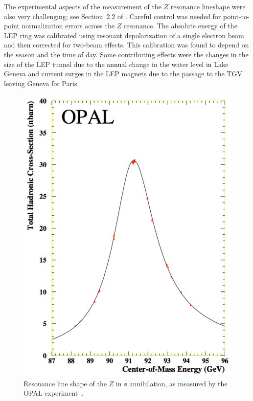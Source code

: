 \documentclass[12pt]{article}
\begin{document}
The experimental aspects of the measurement of the $Z$ resonance
lineshape were also very challenging; see Section~2.2 of \cite{LEPEWWG}.  Careful control was needed for
point-to-point normalization errors across the $Z$ resonance.  The
absolute energy of the LEP ring was calibrated using resonant
depolarization of a single electron beam and then corrected for
two-beam effects.   This calibration was found to depend on the season
and the time of day.  Some contributing effects were the changes in
the size of the LEP tunnel due to the annual change in the water level
in Lake Geneva and current surges in the LEP magnets due to the
passage to the TGV leaving Geneva for Paris.

\begin{figure}
\begin{center}
\includegraphics[width=0.70\hsize]{OPALZ.pdf}
\end{center}
\caption{Resonance line shape of the $Z$ in $\ee$ annihilation, as 
measured by the OPAL experiment~\cite{OPALZ}.}
\label{fig:OPALZ}
\end{figure}
\end{document}
